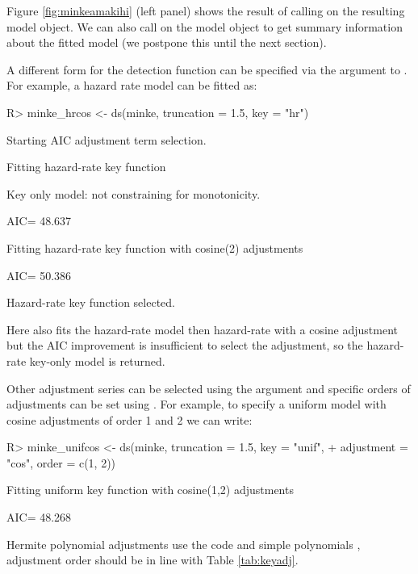 \documentclass[article]{jss}\usepackage[]{graphicx}\usepackage[]{color}
\begin{document}
Figure \ref{fig:minkeamakihi} (left panel) shows the result of calling  on the resulting model object. We can also call  on the model object to get summary information about the fitted model (we postpone this until the next section).

A different form for the detection function can be specified via the  argument to . For example, a hazard rate model can be fitted as:
\begin{Schunk}
\begin{Sinput}
R> minke_hrcos <- ds(minke, truncation = 1.5, key = "hr")
\end{Sinput}
\begin{Soutput}
Starting AIC adjustment term selection.
\end{Soutput}
\begin{Soutput}
Fitting hazard-rate key function
\end{Soutput}
\begin{Soutput}
Key only model: not constraining for monotonicity.
\end{Soutput}
\begin{Soutput}
AIC= 48.637
\end{Soutput}
\begin{Soutput}
Fitting hazard-rate key function with cosine(2) adjustments
\end{Soutput}
\begin{Soutput}
AIC= 50.386
\end{Soutput}
\begin{Soutput}

Hazard-rate key function selected.
\end{Soutput}
\end{Schunk}
Here  also fits the hazard-rate model then hazard-rate with a cosine adjustment but the AIC improvement is insufficient to select the adjustment, so the hazard-rate key-only model is returned.

Other adjustment series can be selected using the  argument and specific orders of adjustments can be set using . For example, to specify a uniform model with cosine adjustments of order 1 and 2 we can write:
\begin{Schunk}
\begin{Sinput}
R> minke_unifcos <- ds(minke, truncation = 1.5, key = "unif",
+                     adjustment = "cos", order = c(1, 2))
\end{Sinput}
\begin{Soutput}
Fitting uniform key function with cosine(1,2) adjustments
\end{Soutput}
\begin{Soutput}
AIC= 48.268
\end{Soutput}
\end{Schunk}
Hermite polynomial adjustments use the code  and simple polynomials , adjustment order should be in line with Table \ref{tab:keyadj}.
\end{document}
